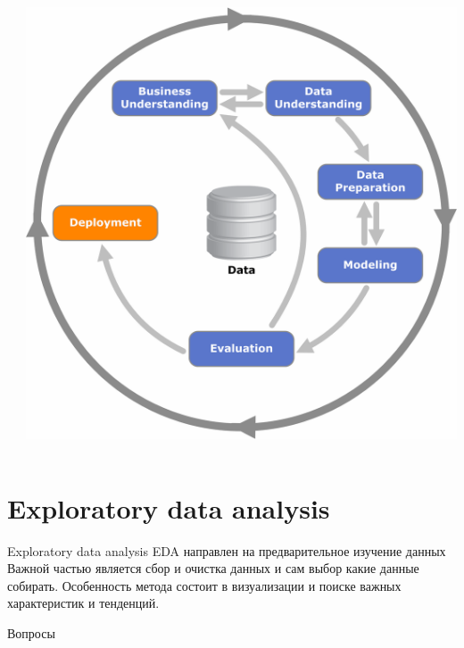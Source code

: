\documentclass[10pt]{beamer}
\begin{document}
\begin{frame}{}

\begin{columns}[C]
    \begin{column}{.5\textwidth}
    	
    \end{column}
       
    \begin{column}{.5\textwidth}
    \vspace{-0em}
	\begin{center}
   		\includegraphics[width=\textwidth]{images/crisp-d.png}
    \end{center}
    \end{column}
  \end{columns}

\end{frame}

\section{Exploratory data analysis}

\begin{frame}{Exploratory data analysis}
EDA направлен на предварительное изучение данных Важной частью является сбор и очистка данных и сам выбор какие данные собирать. Особенность метода состоит в визуализации и поиске важных характеристик и тенденций.
\end{frame}

\begin{frame}[plain]
\begin{center}
{\Large Вопросы}
\end{center}
\end{frame}
\end{document}
